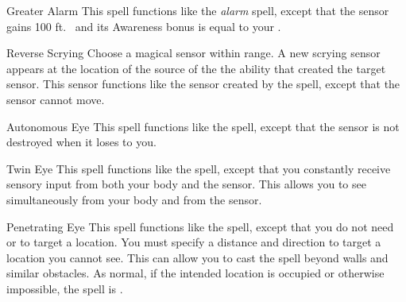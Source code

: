 \lowercase{\hypertarget{spell:Greater Alarm}{}}\label{spell:Greater Alarm}
\begin{ability}[\nth{2}]{\hypertarget{spell:Greater Alarm}{Greater Alarm}}
This spell functions like the \textit{alarm} spell, except that the sensor gains 100 ft.\  and its Awareness bonus is equal to your .
\end{ability}
\vspace{0.25em}



\lowercase{\hypertarget{spell:Reverse Scrying}{}}\label{spell:Reverse Scrying}
\begin{ability}[\nth{2}]{\hypertarget{spell:Reverse Scrying}{Reverse Scrying}}
Choose a magical sensor within \rngmed range.
A new scrying sensor appears at the location of the source of the the ability that created the target sensor.
This sensor functions like the sensor created by the  spell, except that the sensor cannot move.
\end{ability}
\vspace{0.25em}



\lowercase{\hypertarget{spell:Autonomous Eye}{}}\label{spell:Autonomous Eye}
\begin{ability}[\nth{3}]{\hypertarget{spell:Autonomous Eye}{Autonomous Eye}}
This spell functions like the  spell, except that the sensor is not destroyed when it loses  to you.
\end{ability}
\vspace{0.25em}



\lowercase{\hypertarget{spell:Twin Eye}{}}\label{spell:Twin Eye}
\begin{ability}[\nth{3}]{\hypertarget{spell:Twin Eye}{Twin Eye}}
This spell functions like the  spell, except that you constantly receive sensory input from both your body and the sensor.
This allows you to see simultaneously from your body and from the sensor.
\end{ability}
\vspace{0.25em}



\lowercase{\hypertarget{spell:Penetrating Eye}{}}\label{spell:Penetrating Eye}
\begin{ability}[\nth{4}]{\hypertarget{spell:Penetrating Eye}{Penetrating Eye}}
This spell functions like the  spell, except that you do not need  or  to target a location.
You must specify a distance and direction to target a location you cannot see.
This can allow you to cast the spell beyond walls and similar obstacles.
As normal, if the intended location is occupied or otherwise impossible, the spell is .
\end{ability}
\vspace{0.25em}



